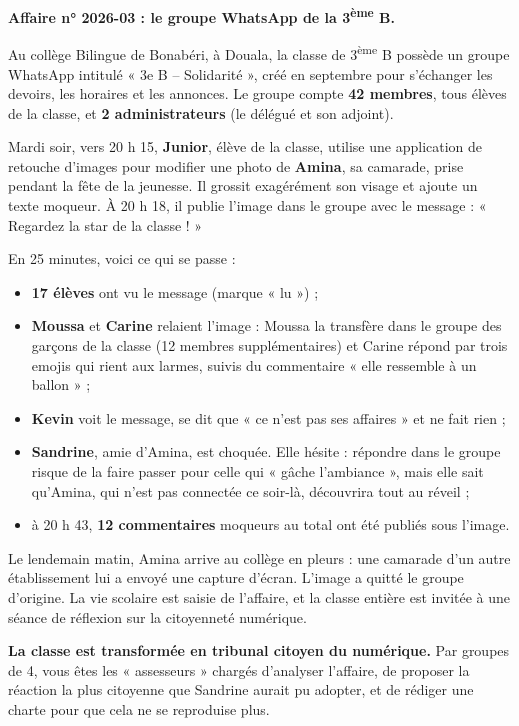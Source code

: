 \documentclass[11pt]{article}
\newcounter{popsec}
\newcounter{popsub}
\newcommand{\courssub}[1]{%
  \stepcounter{popsub}%
  \par\vspace{9pt}\noindent{\popxbold\fontsize{11.5}{13}\selectfont\color{popink}{\color{poporange}\thepopsec.\thepopsub}\hspace{6pt}#1}\par\nopagebreak\vspace{4pt}
}
\begin{document}
\courssub{Situation}

\textbf{Affaire n° 2026-03 : le groupe WhatsApp de la 3\textsuperscript{ème} B.}

Au collège Bilingue de Bonabéri, à Douala, la classe de 3\textsuperscript{ème} B possède un groupe WhatsApp intitulé « 3e B – Solidarité », créé en septembre pour s'échanger les devoirs, les horaires et les annonces. Le groupe compte \textbf{42 membres}, tous élèves de la classe, et \textbf{2 administrateurs} (le délégué et son adjoint).

Mardi soir, vers 20 h 15, \textbf{Junior}, élève de la classe, utilise une application de retouche d'images pour modifier une photo de \textbf{Amina}, sa camarade, prise pendant la fête de la jeunesse. Il grossit exagérément son visage et ajoute un texte moqueur. À 20 h 18, il publie l'image dans le groupe avec le message : « Regardez la star de la classe ! »

En 25 minutes, voici ce qui se passe :

\begin{itemize}
\item \textbf{17 élèves} ont vu le message (marque « lu ») ;
\item \textbf{Moussa} et \textbf{Carine} relaient l'image : Moussa la transfère dans le groupe des garçons de la classe (12 membres supplémentaires) et Carine répond par trois emojis qui rient aux larmes, suivis du commentaire « elle ressemble à un ballon » ;
\item \textbf{Kevin} voit le message, se dit que « ce n'est pas ses affaires » et ne fait rien ;
\item \textbf{Sandrine}, amie d'Amina, est choquée. Elle hésite : répondre dans le groupe risque de la faire passer pour celle qui « gâche l'ambiance », mais elle sait qu'Amina, qui n'est pas connectée ce soir-là, découvrira tout au réveil ;
\item à 20 h 43, \textbf{12 commentaires} moqueurs au total ont été publiés sous l'image.
\end{itemize}

Le lendemain matin, Amina arrive au collège en pleurs : une camarade d'un autre établissement lui a envoyé une capture d'écran. L'image a quitté le groupe d'origine. La vie scolaire est saisie de l'affaire, et la classe entière est invitée à une séance de réflexion sur la citoyenneté numérique.

\textbf{La classe est transformée en tribunal citoyen du numérique.} Par groupes de 4, vous êtes les « assesseurs » chargés d'analyser l'affaire, de proposer la réaction la plus citoyenne que Sandrine aurait pu adopter, et de rédiger une charte pour que cela ne se reproduise plus.
\end{document}
